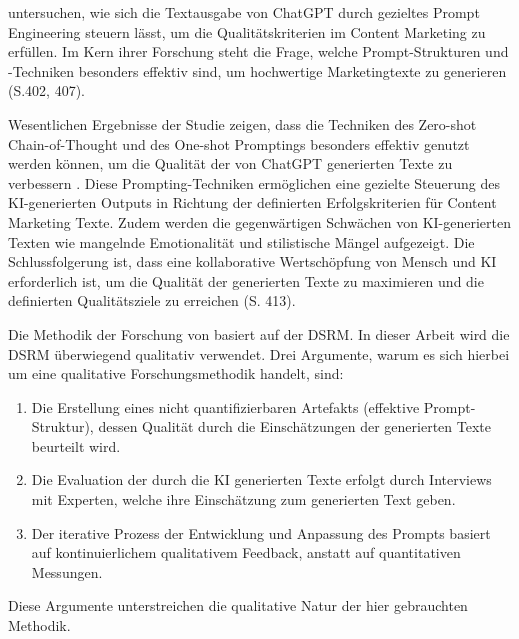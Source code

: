 \textcite[S.404]{steinmann2024} untersuchen, wie sich die Textausgabe von ChatGPT durch gezieltes Prompt Engineering steuern lässt, um die Qualitätskriterien im Content Marketing zu erfüllen. Im Kern ihrer Forschung steht die Frage, welche Prompt-Strukturen und -Techniken besonders effektiv sind, um hochwertige Marketingtexte zu generieren (S.402, 407).

Wesentlichen Ergebnisse der Studie zeigen, dass die Techniken des Zero-shot Chain-of-Thought und des One-shot Promptings besonders effektiv genutzt werden können, um die Qualität der von ChatGPT generierten Texte zu verbessern \parencite[S. 412]{steinmann2024}. Diese Prompting-Techniken ermöglichen eine gezielte Steuerung des \ac{KI}-generierten Outputs in Richtung der definierten Erfolgskriterien für Content Marketing Texte. Zudem werden die gegenwärtigen Schwächen von \ac{KI}-generierten Texten wie mangelnde Emotionalität und stilistische Mängel aufgezeigt. Die Schlussfolgerung ist, dass eine kollaborative Wertschöpfung von Mensch und \ac{KI} erforderlich ist, um die Qualität der generierten Texte zu maximieren und die definierten Qualitätsziele zu erreichen (S. 413).

Die Methodik der Forschung von \textcite[S. 406-412]{steinmann2024} basiert auf der \ac{DSRM}. In dieser Arbeit  wird die \ac{DSRM} überwiegend qualitativ verwendet. Drei Argumente, warum es sich hierbei um eine qualitative Forschungsmethodik handelt, sind:
\begin{enumerate}
	\item Die Erstellung eines nicht quantifizierbaren Artefakts (effektive Prompt-Struktur), dessen Qualität durch die Einschätzungen der generierten Texte beurteilt wird.
	\item Die Evaluation der durch die KI generierten Texte erfolgt durch Interviews mit Experten, welche ihre Einschätzung zum generierten Text geben.
	\item Der iterative Prozess der Entwicklung und Anpassung des Prompts basiert auf kontinuierlichem qualitativem Feedback, anstatt auf quantitativen Messungen.
\end{enumerate}

Diese Argumente unterstreichen die qualitative Natur der hier gebrauchten Methodik.
